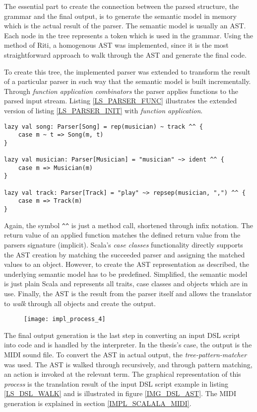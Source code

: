 The essential part to create the connection between the parsed structure, the grammar and the final output, is to generate the semantic model in memory which is the actual result of the parser. The semantic model is usually an AST. Each node in the tree represents a token which is used in the grammar. Using the method of Riti, a homogenous AST was implemented, since it is the most straightforward approach to walk through the AST and generate the final code.\cite{Riti2018}

To create this tree, the implemented parser was extended to transform the result of a particular parser in such way that the semantic model is built incrementally. Through \textit{function application combinators} the parser applies functions to the parsed input stream. Listing \ref{LS_PARSER_FUNC} illustrates the extended version of listing \ref{LS_PARSER_INIT} with \textit{function application}.

\begin{lstlisting}[caption={Parser combinator rules extended through \textit{function application}.}, label=LS_PARSER_FUNC]
lazy val song: Parser[Song] = rep(musician) ~ track ^^ {
	case m ~ t => Song(m, t)
}

lazy val musician: Parser[Musician] = "musician" ~> ident ^^ {
	case m => Musician(m)
}

lazy val track: Parser[Track] = "play" ~> repsep(musician, ",") ^^ {
	case m => Track(m)
}
\end{lstlisting}

Again, the symbol \lstinline|^^| is just a method call, shortened through infix notation.\cite{Ghosh2010} The return value of an applied function matches the defined return value from the parsers signature (implicit). Scala's \textit{case classes} functionality directly supports the AST creation by matching the succeeded parser and assigning the matched values to an object. However, to create the AST representation as described, the underlying semantic model has to be predefined. Simplified, the semantic model is just plain Scala and represents all traits, case classes and objects which are in use. Finally, the AST is the result from the parser itself and allows the translator to \textit{walk} through all objects and create the output.


\begin{figure}[h]
\centering
\texttt{[image: impl\_process\_4]}
\end{figure}

The final output generation is the last step in converting an input DSL script into code and is handled by the interpreter. In the thesis's case, the output is the MIDI sound file. To convert the AST in actual output, the \textit{tree-pattern-matcher} was used.\cite{Riti2018} The AST is walked through recursively, and through pattern matching, an action is invoked at the relevant term. The graphical representation of this \textit{process} is the translation result of the input DSL script example in listing \ref{LS_DSL_WALK} and is illustrated in figure \ref{IMG_DSL_AST}. The MIDI generation is explained in section \ref{IMPL_SCALALA_MIDI}.


